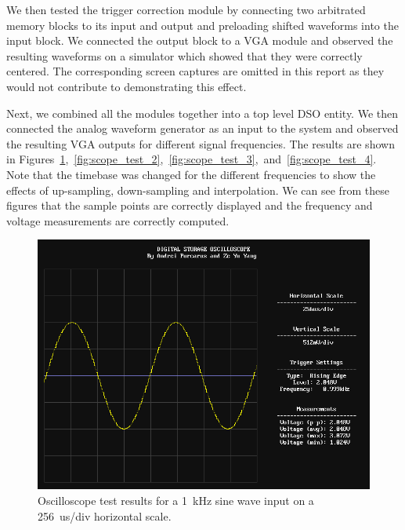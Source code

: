 \documentclass[journal,hidelinks]{IEEEtran}
\begin{document}
We then tested the trigger correction module by connecting two arbitrated memory blocks to its input and output and preloading shifted waveforms into the input block. We connected the output block to a VGA module and observed the resulting waveforms on a simulator which showed that they were correctly centered. The corresponding screen captures are omitted in this report as they would not contribute to demonstrating this effect.

Next, we combined all the modules together into a top level DSO entity. We then connected the analog waveform generator as an input to the system and observed the resulting VGA outputs for different signal frequencies. The results are shown in Figures~\ref{fig:scope_test_1},~\ref{fig:scope_test_2},~\ref{fig:scope_test_3},~and~\ref{fig:scope_test_4}. Note that the timebase was changed for the different frequencies to show the effects of up-sampling, down-sampling and interpolation. We can see from these figures that the sample points are correctly displayed and the frequency and voltage measurements are correctly computed.

\begin{figure}[!htb]
  \centering
  \includegraphics[width=\columnwidth]{test-results/scope_demo_1kHz.png}
  \caption{Oscilloscope test results for a 1~kHz sine wave input on a 256~us/div horizontal scale.}
  \label{fig:scope_test_1}
\end{figure}
\end{document}
